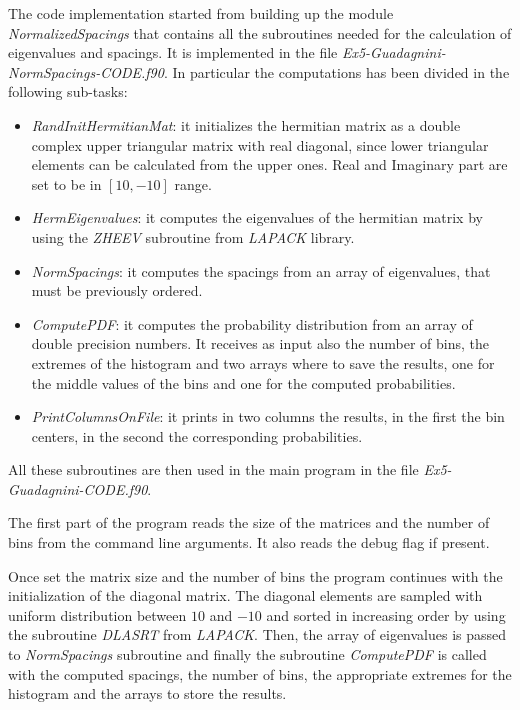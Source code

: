\documentclass[11pt,a4paper]{article}
\begin{document}
The code implementation started from building up the module \textit{NormalizedSpacings} that contains all the subroutines needed for the calculation of eigenvalues and spacings. It is implemented in the file \textit{Ex5-Guadagnini-NormSpacings-CODE.f90}.
In particular the computations has been divided in the following sub-tasks:
\begin{itemize}
	\item \textit{RandInitHermitianMat}: it initializes the hermitian matrix as a double complex upper triangular matrix with real diagonal, since lower triangular elements can be calculated from the upper ones. Real and Imaginary part are set to be in $[10 , -10]$ range.
	\item \textit{HermEigenvalues}: it computes the eigenvalues of the hermitian matrix by using the \textit{ZHEEV} subroutine from \textit{LAPACK} library.
	\item \textit{NormSpacings}: it computes the spacings from an array of eigenvalues, that must be previously ordered.
	\item \textit{ComputePDF}: it computes the probability distribution from an array of double precision numbers. It receives as input also the number of bins, the extremes of the histogram and two arrays where to save the results, one for the middle values of the bins and one for the computed probabilities. 
	\item \textit{PrintColumnsOnFile}: it prints in two columns the results, in the first the bin centers, in the second the corresponding probabilities.
\end{itemize}

All these subroutines are then used in the main program in the file \textit{Ex5-Guadagnini-CODE.f90}.

The first part of the program reads the size of the matrices and the number of bins from the command line arguments. It also reads the debug flag if present.

Once set the matrix size and the number of bins the program continues with the initialization of the diagonal matrix. 
The diagonal elements are sampled with uniform distribution between $10$ and $-10$ and sorted in increasing order by using the subroutine \textit{DLASRT} from \textit{LAPACK}. 
Then, the array of eigenvalues is passed to \textit{NormSpacings} subroutine and finally the subroutine \textit{ComputePDF} is called with the computed spacings, the number of bins, the appropriate extremes for the histogram and the arrays to store the results.
\end{document}
